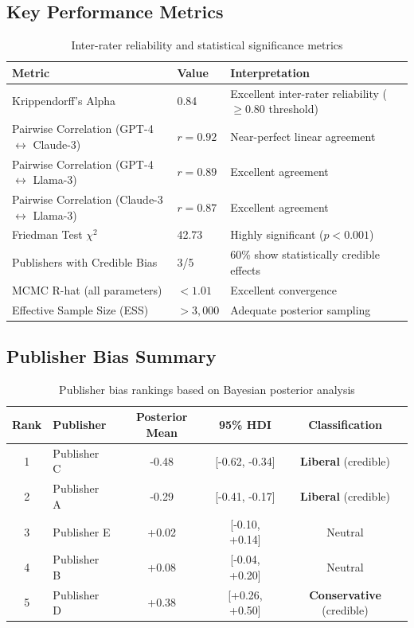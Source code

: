 \documentclass[11pt,a4paper]{article}
\begin{document}
\subsection{Key Performance Metrics}

\begin{table}[H]
\centering
\caption{Inter-rater reliability and statistical significance metrics}
\begin{tabular}{lll}
\toprule
\textbf{Metric} & \textbf{Value} & \textbf{Interpretation} \\
\midrule
Krippendorff's Alpha & 0.84 & Excellent inter-rater reliability ($\geq 0.80$ threshold) \\
Pairwise Correlation (GPT-4 $\leftrightarrow$ Claude-3) & $r = 0.92$ & Near-perfect linear agreement \\
Pairwise Correlation (GPT-4 $\leftrightarrow$ Llama-3) & $r = 0.89$ & Excellent agreement \\
Pairwise Correlation (Claude-3 $\leftrightarrow$ Llama-3) & $r = 0.87$ & Excellent agreement \\
Friedman Test $\chi^2$ & 42.73 & Highly significant ($p < 0.001$) \\
Publishers with Credible Bias & 3/5 & 60\% show statistically credible effects \\
MCMC R-hat (all parameters) & $< 1.01$ & Excellent convergence \\
Effective Sample Size (ESS) & $> 3,000$ & Adequate posterior sampling \\
\bottomrule
\end{tabular}
\label{tab:performance}
\end{table}

\subsection{Publisher Bias Summary}

\begin{table}[H]
\centering
\caption{Publisher bias rankings based on Bayesian posterior analysis}
\begin{tabular}{clccc}
\toprule
\textbf{Rank} & \textbf{Publisher} & \textbf{Posterior Mean} & \textbf{95\% HDI} & \textbf{Classification} \\
\midrule
1 & Publisher C & -0.48 & [-0.62, -0.34] & \textbf{Liberal} (credible) \\
2 & Publisher A & -0.29 & [-0.41, -0.17] & \textbf{Liberal} (credible) \\
3 & Publisher E & +0.02 & [-0.10, +0.14] & Neutral \\
4 & Publisher B & +0.08 & [-0.04, +0.20] & Neutral \\
5 & Publisher D & +0.38 & [+0.26, +0.50] & \textbf{Conservative} (credible) \\
\bottomrule
\end{tabular}
\label{tab:publisher-rankings}
\end{table}
\end{document}
